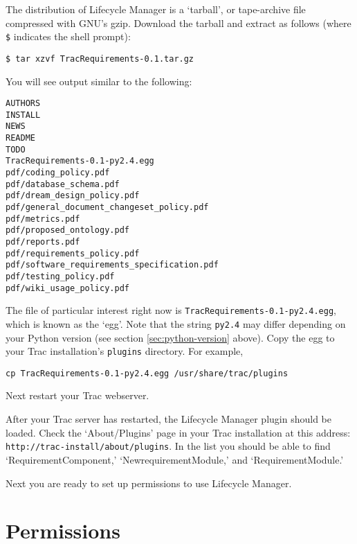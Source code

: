 \documentclass{article}
\begin{document}
The distribution of Lifecycle Manager is a `tarball', or tape-archive file
compressed with GNU's gzip. Download the tarball and extract as follows (where
\texttt{\$} indicates the shell prompt):
\begin{verbatim}
$ tar xzvf TracRequirements-0.1.tar.gz
\end{verbatim}
You will see output similar to the following:
\begin{verbatim}
AUTHORS
INSTALL
NEWS
README
TODO
TracRequirements-0.1-py2.4.egg
pdf/coding_policy.pdf
pdf/database_schema.pdf
pdf/dream_design_policy.pdf
pdf/general_document_changeset_policy.pdf
pdf/metrics.pdf
pdf/proposed_ontology.pdf
pdf/reports.pdf
pdf/requirements_policy.pdf
pdf/software_requirements_specification.pdf
pdf/testing_policy.pdf
pdf/wiki_usage_policy.pdf
\end{verbatim}
The file of particular interest right now is
\texttt{TracRequirements-0.1-py2.4.egg}, which is known as the `egg'. Note that the
string \texttt{py2.4} may differ depending on your Python version (see section
\ref{sec:python-version} above). Copy the egg to your Trac installation's
\texttt{plugins} directory. For example,
\begin{verbatim}
cp TracRequirements-0.1-py2.4.egg /usr/share/trac/plugins
\end{verbatim}
Next restart your Trac webserver.

After your Trac server has restarted, the Lifecycle Manager plugin should be
loaded. Check the `About/Plugins' page in your Trac installation at this
address: \texttt{http://trac-install/about/plugins}. In the list you should be
able to find `RequirementComponent,' `NewrequirementModule,' and
`RequirementModule.'

Next you are ready to set up permissions to use Lifecycle Manager.


\section{Permissions}
\end{document}
